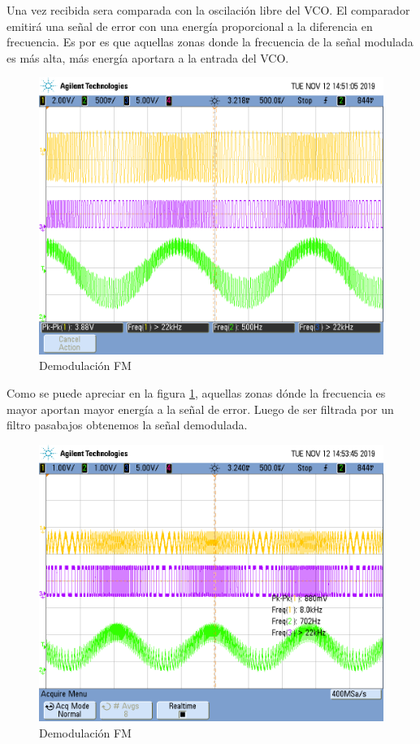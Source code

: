 Una vez recibida sera comparada con la oscilación libre del VCO. El comparador emitirá una señal de error con una energía proporcional a la diferencia en frecuencia. Es por es que aquellas zonas donde la frecuencia de la señal modulada es más alta, más energía aportara a la entrada del VCO.

\begin{figure}[H]
	\centering
	\includegraphics[scale=0.5]{ImagenesOsciloscopio/Demodulacion.png}
	\caption{Demodulación FM}
	\label{freqdemod0}
\end{figure}

Como se puede apreciar en la figura \ref{freqdemod0}, aquellas zonas dónde la frecuencia es mayor aportan mayor energía a la señal de error. Luego de ser filtrada por un filtro pasabajos obtenemos la señal demodulada.
\begin{figure}[H]
	\centering
	\includegraphics[scale=0.5]{ImagenesOsciloscopio/Demodulacion2.png}
	\caption{Demodulación FM}
	\label{freqdemod1}
\end{figure}

